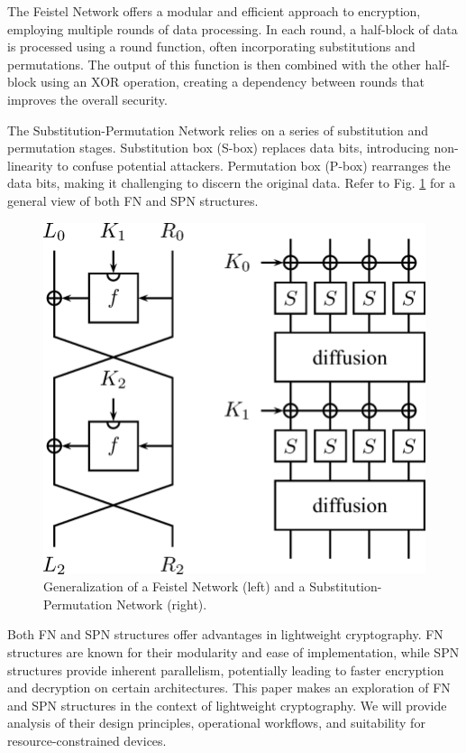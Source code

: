 \documentclass[conference]{IEEEtran}
\begin{document}
The Feistel Network offers a modular and efficient approach to encryption, employing multiple rounds of data processing. In each round, a half-block of data is processed using a round function, often incorporating substitutions and permutations. The output of this function is then combined with the other half-block using an XOR operation, creating a dependency between rounds that improves the overall security\cite{FEISTEL}.

The Substitution-Permutation Network relies on a series of substitution and permutation stages. Substitution box (S-box) replaces data bits, introducing non-linearity to confuse potential attackers. Permutation box (P-box) rearranges the data bits, making it challenging to discern the original data\cite{heys1996substitution}. Refer to Fig. \ref{fig:FEISTEL-SPN} for a general view of both FN and SPN structures.

\begin{figure}
  \centering
  \includegraphics[width=\columnwidth]{figures/FEISTEL-SPN.png}
  \caption{Generalization of a Feistel Network (left) and a Substitution-Permutation Network (right)\cite{de2006introduction}.}
  \label{fig:FEISTEL-SPN}
\end{figure}

Both FN and SPN structures offer advantages in lightweight cryptography. FN structures are known for their modularity and ease of implementation, while SPN structures provide inherent parallelism, potentially leading to faster encryption and decryption on certain architectures.
This paper makes an exploration of FN and SPN structures in the context of lightweight cryptography. We will provide analysis of their design principles, operational workflows, and suitability for resource-constrained devices.
\end{document}
